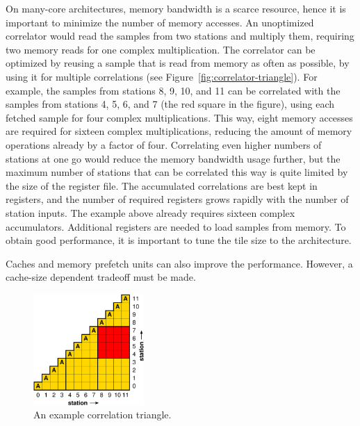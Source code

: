 \documentclass{article}
\begin{document}
On many-core architectures, memory bandwidth is a scarce resource, hence it is
important to minimize the number of memory accesses.
An unoptimized correlator would read the samples from two stations and
multiply them, requiring two memory reads for one complex multiplication.
The correlator can be optimized by reusing a sample that is read from memory
as often as possible, by using it for multiple correlations (see
Figure~\ref{fig:correlator-triangle}).
For example, the samples from stations 8, 9, 10, and 11 can be correlated
with the samples from stations 4, 5, 6, and 7 (the red square in the figure),
using each fetched sample for four complex multiplications.
This way, eight memory accesses are required for sixteen complex
multiplications, reducing the amount of memory operations already by a factor
of four.
Correlating even higher numbers of stations at one go would reduce the
memory bandwidth usage further, but the maximum number of stations that can
be correlated this way is quite limited by the size of the register file.
The accumulated correlations are best kept in registers, and the number of
required registers grows rapidly with the number of station inputs.
The example above already requires sixteen complex accumulators.
Additional registers are needed to load samples from memory.
To obtain good performance, it is important to tune the tile size to the
architecture.

Caches and memory prefetch units can also improve the performance.
However, a cache-size dependent tradeoff must be made.




\begin{figure}[t]
\begin{center}
\includegraphics[width=4.2cm]{figures/correlation-triangle.pdf}
\end{center}
\vspace{-0.5cm}
\caption{An example correlation triangle.}
\label{fig-correlation}
\end{figure}
\end{document}
